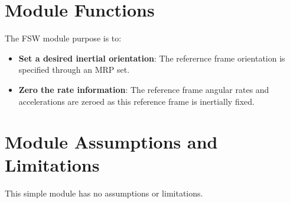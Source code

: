 

\section{Module Functions}
The FSW module purpose is to:
\begin{itemize}
	\item \textbf{Set a desired inertial orientation}: The referernce frame orientation is specified through an MRP set.
	\item \textbf{Zero the rate information}: The reference frame angular rates and accelerations are zeroed as this reference frame is inertially fixed. 
\end{itemize}

\section{Module Assumptions and Limitations}
This simple module has no assumptions or limitations. 